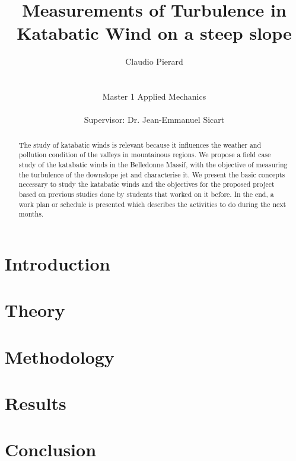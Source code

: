 \documentclass[a4paper,12pt]{article}
\title{Measurements of Turbulence in Katabatic Wind on a steep slope}
\author{Claudio Pierard \\
\\
\\
Master 1 Applied Mechanics\\
\\
Supervisor: Dr. Jean-Emmanuel Sicart}
\begin{document}
\renewcommand{\labelitemi}{$\bullet$}

\maketitle
\begin{abstract}
The study of katabatic winds is relevant because it influences the weather and pollution condition of the valleys in mountainous regions. We propose a field case study of the katabatic winds in the Belledonne Massif, with the objective of measuring the turbulence of the downslope jet and characterise it. We present the basic concepts necessary to study the katabatic winds and the objectives for the proposed project based on previous studies done by students that worked on it before. In the end, a work plan or schedule is presented which describes the activities to do during the next months.
   
\end{abstract}

\newpage

\tableofcontents

\newpage

\section{Introduction}


\section{Theory}


\section{Methodology}


\section{Results}


\section{Conclusion}


\clearpage


\end{document}
